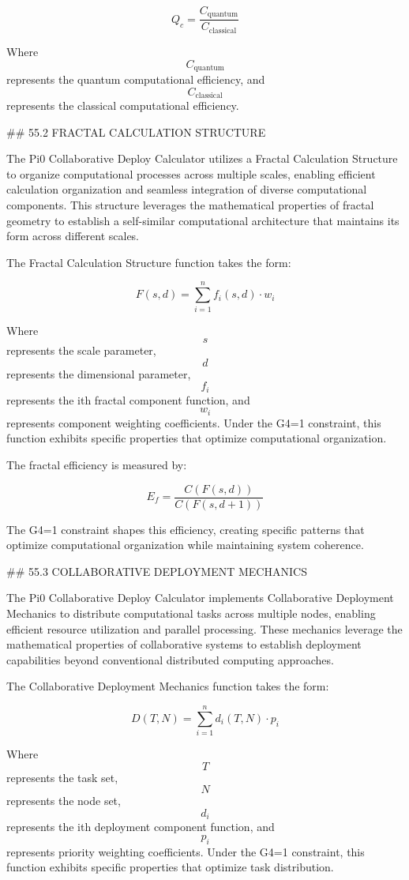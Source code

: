 $$ Q_c = \frac{C_{\text{quantum}}}{C_{\text{classical}}} $$

Where $$ C_{\text{quantum}} $$ represents the quantum computational efficiency, and $$ C_{\text{classical}} $$ represents the classical computational efficiency.

## 55.2 FRACTAL CALCULATION STRUCTURE

The Pi0 Collaborative Deploy Calculator utilizes a Fractal Calculation Structure to organize computational processes across multiple scales, enabling efficient calculation organization and seamless integration of diverse computational components. This structure leverages the mathematical properties of fractal geometry to establish a self-similar computational architecture that maintains its form across different scales.

The Fractal Calculation Structure function takes the form:

$$ F(s, d) = \sum_{i=1}^{n} f_i(s, d) \cdot w_i $$

Where $$ s $$ represents the scale parameter, $$ d $$ represents the dimensional parameter, $$ f_i $$ represents the ith fractal component function, and $$ w_i $$ represents component weighting coefficients. Under the G4=1 constraint, this function exhibits specific properties that optimize computational organization.

The fractal efficiency is measured by:

$$ E_f = \frac{C(F(s, d))}{C(F(s, d+1))} $$

The G4=1 constraint shapes this efficiency, creating specific patterns that optimize computational organization while maintaining system coherence.

## 55.3 COLLABORATIVE DEPLOYMENT MECHANICS

The Pi0 Collaborative Deploy Calculator implements Collaborative Deployment Mechanics to distribute computational tasks across multiple nodes, enabling efficient resource utilization and parallel processing. These mechanics leverage the mathematical properties of collaborative systems to establish deployment capabilities beyond conventional distributed computing approaches.

The Collaborative Deployment Mechanics function takes the form:

$$ D(T, N) = \sum_{i=1}^{n} d_i(T, N) \cdot p_i $$

Where $$ T $$ represents the task set, $$ N $$ represents the node set, $$ d_i $$ represents the ith deployment component function, and $$ p_i $$ represents priority weighting coefficients. Under the G4=1 constraint, this function exhibits specific properties that optimize task distribution.

